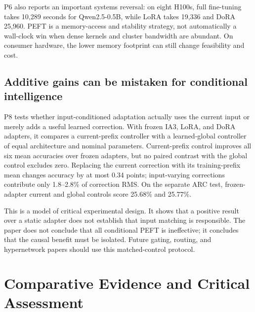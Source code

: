 \documentclass[11pt]{article}
\begin{document}
P6 also reports an important systems reversal: on eight H100s, full fine-tuning takes 10,289 seconds for Qwen2.5-0.5B, while LoRA takes 19,336 and DoRA 25,960. PEFT is a memory-access and stability strategy, not automatically a wall-clock win when dense kernels and cluster bandwidth are abundant. On consumer hardware, the lower memory footprint can still change feasibility and cost.

\subsection{Additive gains can be mistaken for conditional intelligence}

P8 tests whether input-conditioned adaptation actually uses the current input or merely adds a useful learned correction. With frozen IA3, LoRA, and DoRA adapters, it compares a current-prefix controller with a learned-global controller of equal architecture and nominal parameters. Current-prefix control improves all six mean accuracies over frozen adapters, but no paired contrast with the global control excludes zero. Replacing the current correction with its training-prefix mean changes accuracy by at most 0.34 points; input-varying corrections contribute only 1.8--2.8\% of correction RMS. On the separate ARC test, frozen-adapter current and global controls score 25.68\% and 25.77\%.

This is a model of critical experimental design. It shows that a positive result over a static adapter does not establish that input matching is responsible. The paper does not conclude that all conditional PEFT is ineffective; it concludes that the causal benefit must be isolated. Future gating, routing, and hypernetwork papers should use this matched-control protocol.

\section{Comparative Evidence and Critical Assessment}
\end{document}
